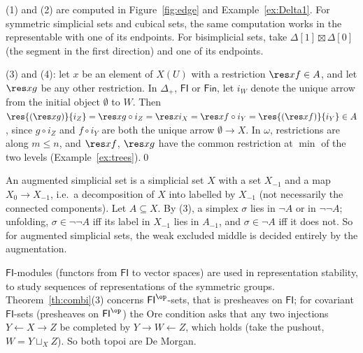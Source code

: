 \direct{} (1) and (2) are computed in Figure~\ref{fig:edge} and Example~\ref{ex:Delta1}. For symmetric simplicial sets and cubical sets, the same computation works in the representable  with one of its endpoints. For bisimplicial sets, take $\Delta[1]\boxtimes\Delta[0]$ (the segment in the first direction) and one of its endpoints.

(3) and (4): let $x$ be an element of $X(U)$ with a restriction $\res xf\in A$, and let $\res xg$ be any other restriction. In $\Delta_+$, $\mathsf{FI}$ or $\mathsf{Fin}$, let $i_W$ denote the unique arrow from the initial object $\emptyset$ to $W$. Then $\res{(\res xg)}{i_Z} = \res x{g\circ i_Z} = \res x{i_X} = \res x{f\circ i_Y} = \res{(\res xf)}{i_Y}\in A$, since $g\circ i_Z$ and $f\circ i_Y$ are both the unique arrow $\emptyset\to X$. In $\omega$, restrictions are along $m\le n$, and $\res xf$, $\res xg$ have the common restriction at $\min$ of the two levels (Example~\ref{ex:trees}).\qed

\begin{example}
An augmented simplicial set is a simplicial set $X$ with a set $X_{-1}$ and a map $X_0\to X_{-1}$, i.e.\ a decomposition of $X$ into  labelled by $X_{-1}$ (not necessarily the connected components). Let $A\subseteq X$. By (3), a simplex $\sigma$ lies in $\neg A$ or in $\neg\neg A$; unfolding, $\sigma\in\neg\neg A$ iff its label in $X_{-1}$ lies in $A_{-1}$, and $\sigma\in\neg A$ iff it does not. So for augmented simplicial sets, the weak excluded middle is decided entirely by the augmentation.
\end{example}

\begin{example}
$\mathsf{FI}$-modules (functors from $\mathsf{FI}$ to vector spaces) are used in representation stability, to study sequences of representations of the symmetric groups. Theorem~\ref{th:combi}(3) concerns $\mathsf{FI}^{\op}$-sets, that is presheaves on $\mathsf{FI}$; for covariant $\mathsf{FI}$-sets (presheaves on $\mathsf{FI}^{\op}$) the Ore condition asks that any two injections $Y\leftarrow X\rightarrow Z$ be completed by $Y\to W\leftarrow Z$, which holds (take the pushout, $W = Y\sqcup_X Z$). So both topoi are De Morgan.
\end{example}

